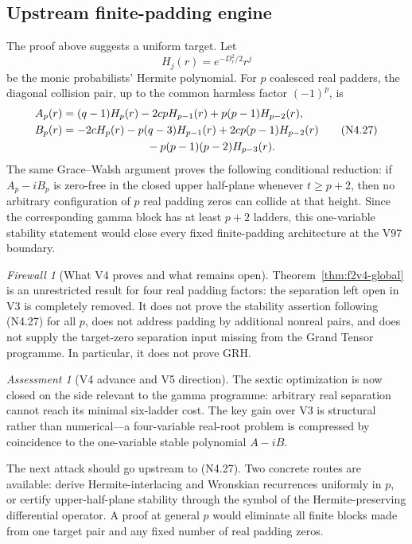 \documentclass[11pt]{article}
\theoremstyle{definition}
\theoremstyle{remark}
\newtheorem{assessment}[theorem]{Assessment}
\newtheorem{firewall}[theorem]{Firewall}
\begin{document}
\subsection{Upstream finite-padding engine}

The proof above suggests a uniform target.  Let
\[
 H_j(r)=e^{-D_r^2/2}r^j
\tag{N4.26}
\]
be the monic probabilists' Hermite polynomial.  For \(p\) coalesced real
padders, the diagonal collision pair, up to the common harmless factor
\((-1)^p\), is
\[
\begin{aligned}
 A_p(r)&=(q-1)H_p(r)-2cpH_{p-1}(r)+p(p-1)H_{p-2}(r),\\
 B_p(r)&=-2cH_p(r)-p(q-3)H_{p-1}(r)
 +2cp(p-1)H_{p-2}(r)\\
 &\hspace{7.6em}-p(p-1)(p-2)H_{p-3}(r).
\end{aligned}
\tag{N4.27}
\]
The same Grace--Walsh argument proves the following conditional reduction:
if \(A_p-iB_p\) is zero-free in the closed upper half-plane whenever
\(t\ge p+2\), then no arbitrary configuration of \(p\) real padding zeros
can collide at that height.  Since the corresponding gamma block has at
least \(p+2\) ladders, this one-variable stability statement would close
every fixed finite-padding architecture at the V97 boundary.

\begin{firewall}[What V4 proves and what remains open]
Theorem~\ref{thm:f2v4-global} is an unrestricted result for four real
padding factors: the separation left open in V3 is completely removed.
It does not prove the stability assertion following \textup{(N4.27)} for
all \(p\), does not address padding by additional nonreal pairs, and does
not supply the target-zero separation input missing from the Grand Tensor
programme.  In particular, it does not prove GRH.
\end{firewall}

\begin{assessment}[V4 advance and V5 direction]
The sextic optimization is now closed on the side relevant to the gamma
programme: arbitrary real separation cannot reach its minimal six-ladder
cost.  The key gain over V3 is structural rather than numerical---a
four-variable real-root problem is compressed by coincidence to the
one-variable stable polynomial \(A-iB\).

The next attack should go upstream to \textup{(N4.27)}.  Two concrete
routes are available: derive Hermite-interlacing and Wronskian recurrences
uniformly in \(p\), or certify upper-half-plane stability through the
symbol of the Hermite-preserving differential operator.  A proof at
general \(p\) would eliminate all finite blocks made from one target pair
and any fixed number of real padding zeros.
\end{assessment}
\end{document}
